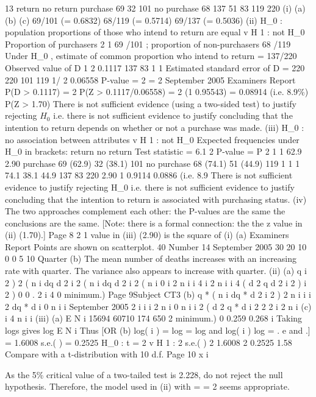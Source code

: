 \documentclass[a4paper,12pt]{article}
\begin{document}
13
return
no return
purchase
69
32
101
no purchase
68
137
51
83
119
220
(i) (a)
(b)
(c)
69/101 (= 0.6832)
68/119 (= 0.5714)
69/137 (= 0.5036)
(ii) H_0 : population proportions of those who intend to return are equal
v H 1 : not H_0
Proportion of purchasers
2
1
69 /101 ; proportion of non-purchasers
68 /119
Under H_0 , estimate of common proportion who intend to return = 137/220
Observed value of D
1
2
0.1117
137 83 1
1
Estimated standard error of D =
220 220 101 119
1/ 2
0.06558
P-value = 2
= 2
September 2005
Examiners Report
P(D > 0.1117) = 2 P(Z > 0.1117/0.06558) = 2
(1 0.95543) = 0.08914 (i.e. 8.9\%)
P(Z > 1.70)
There is not sufficient evidence (using a two-sided test) to justify rejecting $H_0$ i.e. there is not sufficient evidence to justify concluding that the intention to return depends on whether or not a purchase was made.
(iii)
H_0 : no association between attributes v H 1 : not H_0
Expected frequencies under H_0 in brackets:
return
no return
Test statistic = 6.1 2
P-value = P
2
1
1
62.9
2.90
purchase
69 (62.9)
32 (38.1)
101
no purchase
68 (74.1)
51 (44.9)
119
1
1
1
74.1 38.1 44.9
137
83
220
2.90
1 0.9114 0.0886 (i.e. 8.9%
There is not sufficient evidence to justify rejecting H_0 i.e. there is not sufficient evidence to justify concluding that the intention to return is associated with purchasing status.
(iv)
The two approaches complement each other:
the P-values are the same
the conclusions are the same.
[Note: there is a formal connection: the
the z value in (ii) (1.70).]
Page 8
2
1 value
in (iii) (2.90) is the square of
(i)
(a)
Examiners Report
Points are shown on scatterplot.
40
Number
14
September 2005
30
20
10
0
0
5
10
Quarter
(b)
The mean number of deaths increases with an increasing rate with
quarter.
The variance also appears to increase with quarter.
(ii)
(a)
q
i 2 ) 2
( n i
dq
d
2 i 2 ( n i
dq
d
2 i 2 ( n i
0
i 2 n i
i 4
i 2 n i
i 4
(
d 2 q
d
2
i 2 )
i 2 ) 0
0
.
2 i 4
0
minimum.)
Page 9Subject CT3 
(b)
q * ( n i
dq *
d 2
i 2 ) 2
n i
i
i 2
dq *
d
i
0
n i
i
September 2005
2
i
i
i 2
n i
0
n i
i 2
(
d 2 q *
d
i 2
2
2
i 2 n i
(c)
i
4
n i
i
(iii)
(a)
E N i
15694
60710
174
650
2
minimum.)
0
0.259
0.268
i
Taking logs gives
log E N i
Thus
[OR
(b)
log( i ) = log
= log and
log( i ) log
= .
e and
.]
= 1.6008 s.e.( ) = 0.2525
H_0 :
t
= 2 v H 1 :
2
s.e.( )
2
1.6008 2
0.2525
1.58
Compare with a t-distribution with 10 d.f.
Page 10
x i

As the 5\% critical value of a two-tailed test is 2.228, do not reject the null hypothesis.
Therefore, the model used in (ii) with
=
= 2 seems appropriate.
\end{document}
